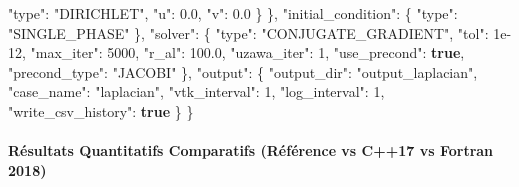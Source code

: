\documentclass[
  10pt,
]{article}
\newenvironment{Shaded}{}{}
\newcommand{\DataTypeTok}[1]{\textcolor[rgb]{0.56,0.13,0.00}{#1}}
\newcommand{\DecValTok}[1]{\textcolor[rgb]{0.25,0.63,0.44}{#1}}
\newcommand{\FloatTok}[1]{\textcolor[rgb]{0.25,0.63,0.44}{#1}}
\newcommand{\FunctionTok}[1]{\textcolor[rgb]{0.02,0.16,0.49}{#1}}
\newcommand{\KeywordTok}[1]{\textcolor[rgb]{0.00,0.44,0.13}{\textbf{#1}}}
\newcommand{\StringTok}[1]{\textcolor[rgb]{0.25,0.44,0.63}{#1}}
\begin{document}
\begin{Shaded}
\begin{Highlighting}[]
      \DataTypeTok{"type"}\FunctionTok{:} \StringTok{"DIRICHLET"}\FunctionTok{,}
      \DataTypeTok{"u"}\FunctionTok{:} \FloatTok{0.0}\FunctionTok{,}
      \DataTypeTok{"v"}\FunctionTok{:} \FloatTok{0.0}
    \FunctionTok{\}}
  \FunctionTok{\},}
  \DataTypeTok{"initial\_condition"}\FunctionTok{:} \FunctionTok{\{}
    \DataTypeTok{"type"}\FunctionTok{:} \StringTok{"SINGLE\_PHASE"}
  \FunctionTok{\},}
  \DataTypeTok{"solver"}\FunctionTok{:} \FunctionTok{\{}
    \DataTypeTok{"type"}\FunctionTok{:} \StringTok{"CONJUGATE\_GRADIENT"}\FunctionTok{,}
    \DataTypeTok{"tol"}\FunctionTok{:} \DecValTok{1e{-}12}\FunctionTok{,}
    \DataTypeTok{"max\_iter"}\FunctionTok{:} \DecValTok{5000}\FunctionTok{,}
    \DataTypeTok{"r\_al"}\FunctionTok{:} \FloatTok{100.0}\FunctionTok{,}
    \DataTypeTok{"uzawa\_iter"}\FunctionTok{:} \DecValTok{1}\FunctionTok{,}
    \DataTypeTok{"use\_precond"}\FunctionTok{:} \KeywordTok{true}\FunctionTok{,}
    \DataTypeTok{"precond\_type"}\FunctionTok{:} \StringTok{"JACOBI"}
  \FunctionTok{\},}
  \DataTypeTok{"output"}\FunctionTok{:} \FunctionTok{\{}
    \DataTypeTok{"output\_dir"}\FunctionTok{:} \StringTok{"output\_laplacian"}\FunctionTok{,}
    \DataTypeTok{"case\_name"}\FunctionTok{:} \StringTok{"laplacian"}\FunctionTok{,}
    \DataTypeTok{"vtk\_interval"}\FunctionTok{:} \DecValTok{1}\FunctionTok{,}
    \DataTypeTok{"log\_interval"}\FunctionTok{:} \DecValTok{1}\FunctionTok{,}
    \DataTypeTok{"write\_csv\_history"}\FunctionTok{:} \KeywordTok{true}
  \FunctionTok{\}}
\FunctionTok{\}}
\end{Highlighting}
\end{Shaded}

\paragraph{Résultats Quantitatifs Comparatifs (Référence vs C++17 vs
Fortran
2018)}\label{ruxe9sultats-quantitatifs-comparatifs-ruxe9fuxe9rence-vs-c17-vs-fortran-2018}
\end{document}
